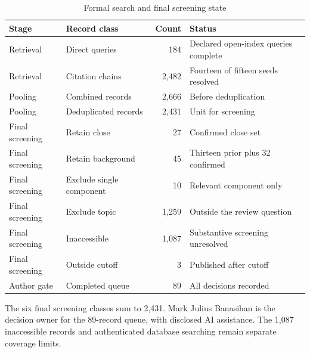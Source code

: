 \begin{table}[t]
\centering
\begin{threeparttable}
\caption{Formal search and final screening state}
\label{tab:formal-search}
\begin{tabularx}{\linewidth}{l X r l}
\toprule
Stage & Record class & Count & Status \\
\midrule
Retrieval & Direct queries & 184 & Declared open-index queries complete \\
Retrieval & Citation chains & 2,482 & Fourteen of fifteen seeds resolved \\
Pooling & Combined records & 2,666 & Before deduplication \\
Pooling & Deduplicated records & 2,431 & Unit for screening \\
\midrule
Final screening & Retain close & 27 & Confirmed close set \\
Final screening & Retain background & 45 & Thirteen prior plus 32 confirmed \\
Final screening & Exclude single component & 10 & Relevant component only \\
Final screening & Exclude topic & 1,259 & Outside the review question \\
Final screening & Inaccessible & 1,087 & Substantive screening unresolved \\
Final screening & Outside cutoff & 3 & Published after cutoff \\
\midrule
Author gate & Completed queue & 89 & All decisions recorded \\
\bottomrule
\end{tabularx}
\begin{tablenotes}[flushleft]\footnotesize
\item The six final screening classes sum to 2,431. Mark Julius Banasihan is the decision owner for the 89-record queue, with disclosed AI assistance. The 1,087 inaccessible records and authenticated database searching remain separate coverage limits.
\end{tablenotes}
\end{threeparttable}
\end{table}


